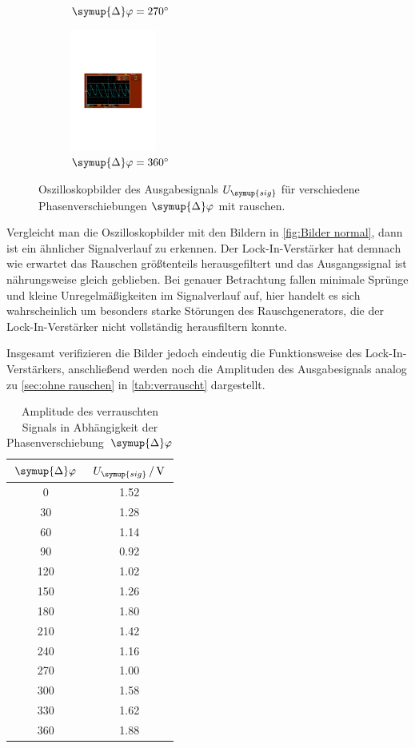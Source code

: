 \begin{figure} [H]
\begin{subfigure}{0.48\textwidth}
    \caption{$\symup{\Delta}\varphi = \qty{270}{\degree}$}
  \end{subfigure}
  \begin{subfigure}{0.48\textwidth}
    \centering
    \includegraphics[height=4cm]{content/Bilder/verrauscht/360.pdf}
    \caption{$\symup{\Delta}\varphi = \qty{360}{\degree}$}
  \end{subfigure}
  \caption{Oszilloskopbilder des Ausgabesignals $U_{\symup{sig}}$ für verschiedene Phasenverschiebungen $\symup{\Delta}\varphi$ mit rauschen.}
  \label{fig:Bilder rausch}
\end{figure}

Vergleicht man die Oszilloskopbilder mit den Bildern in \autoref{fig:Bilder normal}, dann ist
ein ähnlicher Signalverlauf zu erkennen.
Der Lock-In-Verstärker hat demnach wie erwartet das Rauschen größtenteils herausgefiltert und das Ausgangssignal
ist nährungsweise gleich geblieben.
Bei genauer Betrachtung fallen minimale Sprünge und kleine Unregelmäßigkeiten im Signalverlauf auf,
hier handelt es sich wahrscheinlich um besonders starke Störungen des Rauschgenerators, die der Lock-In-Verstärker
nicht vollständig herausfiltern konnte.

Insgesamt verifizieren die Bilder jedoch eindeutig die Funktionsweise des Lock-In-Verstärkers, anschließend
werden noch die Amplituden des Ausgabesignals analog zu \autoref{sec:ohne rauschen} in \autoref{tab:verrauscht} dargestellt.

\begin{table} [H]
  \centering
  \caption{Amplitude des verrauschten Signals in Abhängigkeit der Phasenverschiebung~$\symup{\Delta}\varphi$}
  \label{tab:verrauscht}
  \begin{tabular}{S[table-format=3.0] S[table-format=1.2]}
    \toprule
    {$\symup{\Delta}\varphi$} & {$U_{\symup{sig}}\,/\,\unit{\volt}$} \\
    	  & 1.52 \\
    30	& 1.28 \\
    60	& 1.14 \\
    90	& 0.92 \\
    120	& 1.02 \\
    150	& 1.26 \\
    180	& 1.80 \\
    210	& 1.42 \\
    240	& 1.16 \\
    270	& 1.00 \\
    300	& 1.58 \\
    330	& 1.62 \\
    360	& 1.88 \\
    \bottomrule
  \end{tabular}
\end{table}

